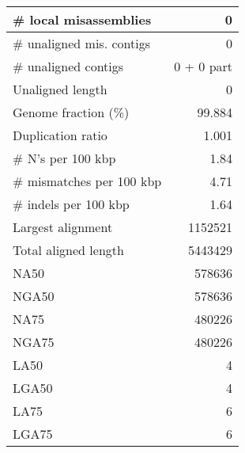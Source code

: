 \documentclass[12pt,a4paper]{article}
\begin{document}
\begin{table}[ht]
\begin{center}
\begin{tabular}{|l*{1}{|r}|}
\# local misassemblies & 0 \\ \hline
\# unaligned mis. contigs & 0 \\ \hline
\# unaligned contigs & 0 + 0 part \\ \hline
Unaligned length & 0 \\ \hline
Genome fraction (\%) & 99.884 \\ \hline
Duplication ratio & 1.001 \\ \hline
\# N's per 100 kbp & 1.84 \\ \hline
\# mismatches per 100 kbp & 4.71 \\ \hline
\# indels per 100 kbp & 1.64 \\ \hline
Largest alignment & 1152521 \\ \hline
Total aligned length & 5443429 \\ \hline
NA50 & 578636 \\ \hline
NGA50 & 578636 \\ \hline
NA75 & 480226 \\ \hline
NGA75 & 480226 \\ \hline
LA50 & 4 \\ \hline
LGA50 & 4 \\ \hline
LA75 & 6 \\ \hline
LGA75 & 6 \\ \hline
\end{tabular}
\end{center}
\end{table}
\end{document}
